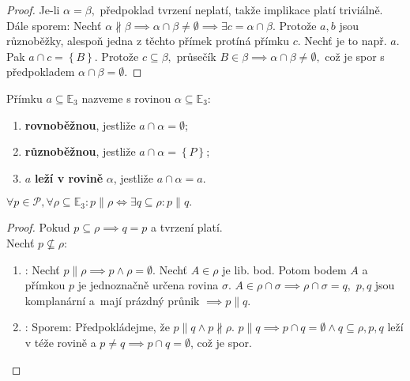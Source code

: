 \begin{proof}
    Je-li $\alpha = \beta,$ předpoklad tvrzení neplatí, takže implikace platí
    triviálně. \\
    Dále sporem: Nechť $\alpha \nparallel \beta \implies \alpha \cap \beta \ne
    \emptyset \implies \exists c = \alpha \cap \beta.$ Protože $a,b$ jsou různoběžky,
    alespoň jedna z těchto přímek protíná přímku $c.$ Nechť je to např. $a.$ Pak
    $a \cap c = \left \{ B \right \} .$ Protože $c\subseteq \beta,$ průsečík
    $B\in \beta \implies \alpha \cap \beta \ne \emptyset,$ což je spor s předpokladem
    $\alpha \cap \beta = \emptyset.$
\end{proof}

\begin{definition}
    Přímku $a \subseteq \mathbb E_3$ nazveme s rovinou $\alpha \subseteq \mathbb E_3:$
    \begin{enumerate}[$i.$]
        \item \textbf{rovnoběžnou}, jestliže $a\cap \alpha = \emptyset$;
        \item \textbf{různoběžnou}, jestliže $a\cap \alpha = \left \{ P \right \} $;
        \item $a$ \textbf{leží v rovině} $\alpha$, jestliže $a \cap \alpha = a$.
    \end{enumerate}
\end{definition}

\begin{veta}
    $\forall p \in \mathscr P, \forall \rho \subseteq \mathbb E_3: p \parallel \rho
    \iff \exists q\subseteq \rho: p\parallel q.$
\end{veta}

\begin{proof}
    Pokud $p \subseteq \rho \implies q=p$ a tvrzení platí.\\
    Nechť $p\not \subseteq \rho:$
    \begin{enumerate}[$i.$]
        \item \uv{$\implies$}: Nechť $p\parallel\rho\implies p\land \rho=\emptyset.$
        Nechť $A\in\rho$ je lib. bod. Potom bodem $A$ a přímkou $p$ je jednoznačně
        určena rovina $\sigma.$ $A\in \rho\cap\sigma \implies \rho\cap\sigma=q,$
        $p,q$ jsou komplanární a~mají prázdný průnik $\implies p\parallel q.$
        \item \uv{$\impliedby$}: Sporem: Předpokládejme, že $p\parallel q \land
        p\nparallel \rho.$ $p\parallel q \implies p\cap q=\emptyset\land q\subseteq \rho,
        p,q$ leží v téže rovině a $p\ne q\implies p\cap q = \emptyset$, což je spor.\qedhere
    \end{enumerate}
\end{proof}


